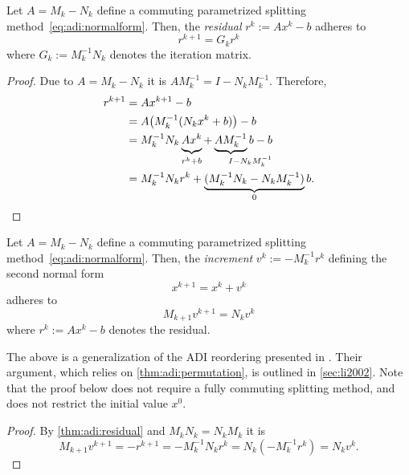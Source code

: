 \begin{proposition}
\label{thm:adi:residual}
  Let $A = M_k - N_k$ define a commuting parametrized splitting method~\eqref{eq:adi:normalform}.
  Then, the \emph{residual} $r^k := Ax^k - b$ adheres to
  \begin{equation*}
    r^{k+1} = G_k r^k
  \end{equation*}
  where $G_k := M_k^{-1} N_k$ denotes the iteration matrix.
\end{proposition}
\begin{proof}
  Due to $A = M_k - N_k$ it is $AM_k^{-1} = I - N_k M_k^{-1}$.
  Therefore,
  \begin{align*}
    r^{k+1}
    &= Ax^{k+1} - b \\
    &= A \big( M_k^{-1} (N_k x^k + b) \big) - b \\
    &= M_k^{-1} N_k \underbrace{
      \vphantom{M_k^{-1}}
      Ax^k
    }_{
      \vphantom{M_k^{-1}}
      r^k + b
    }
    + \underbrace{
      A M_k^{-1}
    }_{
      I\mathrlap{{} - N_k M_k^{-1}}
    } b - b \\
    &= M_k^{-1} N_k r^k + \underbrace{
      (M_k^{-1} N_k - N_k M_k^{-1})
    }_0 b
    .
  \end{align*}
\end{proof}

\begin{corollary}
\label{thm:adi:increment-form}
  Let $A = M_k - N_k$ define a commuting parametrized splitting method~\eqref{eq:adi:normalform}.
  Then, the \emph{increment} $v^k := - M_k^{-1} r^k$ defining the second normal form
  \begin{equation*}
    x^{k+1} = x^k + v^k
  \end{equation*}
  adheres to
  \begin{equation*}
    M_{k+1} v^{k+1} = N_k v^k
  \end{equation*}
  where $r^k := Ax^k - b$ denotes the residual.
\end{corollary}

\begin{remark}
  The above is a generalization of the \ac{ADI} reordering presented in \cite[Section~4]{Li2002}.
  Their argument,
  which relies on \autoref{thm:adi:permutation},
  is outlined in \autoref{sec:li2002}.
  Note that the proof below does not require a fully commuting splitting method,
  and does not restrict the initial value $x^0$.
\end{remark}

\begin{proof}
  By \autoref{thm:adi:residual} and $M_k N_k = N_k M_k$ it is
  \begin{equation*}
    M_{k+1} v^{k+1}
    = - r^{k+1}
    = - M_k^{-1} N_k r^k
    = N_k (- M_k^{-1} r^k)
    = N_k v^k
    .
  \end{equation*}
\end{proof}

